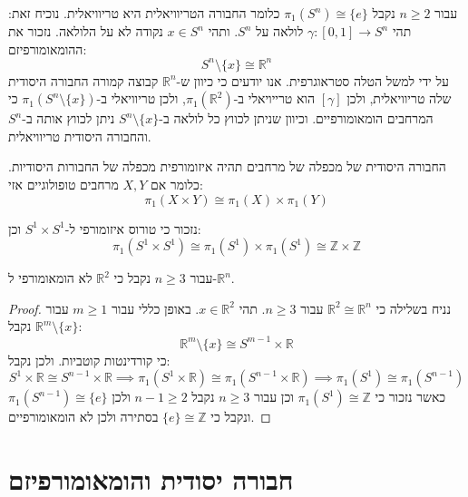 \documentclass{tstextbook}
\begin{document}
\begin{example}
עבור \(n\geq 2\) נקבל \(\pi_{1}(S^{n})\cong \{ e \}\) כלומר החבורה הטריוויאלית היא טריוויאלית. נוכיח זאת:
תהי \(\gamma:[0,1]\to S^{n}\) לולאה על \(S^{n}\). ותהי \(x \in S^{n}\) נקודה לא על הלולאה. נזכור את ההומאומורפיזם:
$$S^{n}\setminus \{ x \}\cong \mathbb{R}^{n}$$
על ידי למשל הטלה סטראוגרפית. אנו יודעים כי כיוון ש-\(\mathbb{R}^{n}\) קבוצה קמורה החבורה היסודית שלה טריוויאלית, ולכן \(\left[ \gamma \right]\) הוא טרייויאלי ב-\(\pi_{1}\left( \mathbb{R}^{2} \right)\), ולכן טריוויאלי ב-\(\pi_{1}\left( S^{n}\setminus \{ x \} \right)\) כי המרחבים הומאומורפיים. וכיוון שניתן לכווץ כל לולאה ב-\(S^{n}\setminus \{ x \}\) ניתן לכווץ אותה ב-\(S^{n}\) והחבורה היסודית טריוויאלית.

\end{example}
\begin{proposition}
החבורה היסודית של מכפלה של מרחבים תהיה איזומורפית מכפלה של החבורות היסודיות. כלומר אם \(X,Y\) מרחבים טופולוגיים אזי:
$$\pi_{1}\left( X\times Y \right)\cong \pi_{1}(X)\times \pi_{1}(Y)$$

\end{proposition}
\begin{example}
נזכור כי טורוס איזומורפי ל-\(S^{1}\times S^{1}\) וכן:
$$\pi_{1}\left( S^{1}\times S^{1}\right)\cong \pi_{1}(S^{1})\times \pi_{1}(S^{1})\cong  \mathbb{Z}\times \mathbb{Z}$$

\end{example}
\begin{example}
עבור \(n\geq 3\) נקבל כי \(\mathbb{R}^{2}\) לא הומאומורפי ל-\(\mathbb{R}^{n}\).

\end{example}
\begin{proof}
נניח בשלילה כי \(\mathbb{R}^{2}\cong \mathbb{R}^{n}\) עבור \(n\geq 3\). תהי \(x\in \mathbb{R}^{2}\). באופן כללי עבור \(m \geq 1\) עבור \(\mathbb{R}^{m}\setminus \{x \}\) נקבל:
$$\mathbb{R}^{m}\setminus \{ x \}\cong S^{m-1}\times \mathbb{R}$$
כי קורדינטות קוטביות. ולכן נקבל:
$$S^{1}\times \mathbb{R}\cong S^{n-1}\times \mathbb{R}\implies \pi_{1}\left( S^{1}\times \mathbb{R} \right)\cong \pi_{1}\left( S^{n-1}\times \mathbb{R} \right)\implies \pi_{1}(S^{1})\cong \pi_{1}(S^{n-1})$$
כאשר נזכור כי \(\pi_{1}(S^{1})\cong\mathbb{Z}\) וכן עבור \(n\geq 3\) נקבל \(n-1\geq 2\) ולכן \(\pi_{1}(S^{n-1})\cong\{ e \}\) ונקבל כי \(\{ e \}\cong \mathbb{Z}\) בסתירה ולכן לא הומאומורפיים.

\end{proof}
\section{חבורה יסודית והומאומורפיזם}
\end{document}

